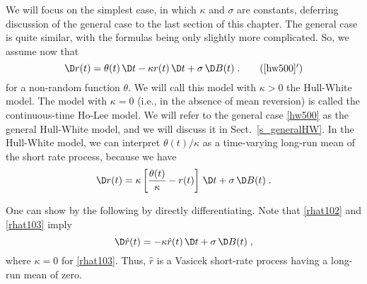 We will focus on the simplest case, in which $\kappa$ and $\sigma$ are constants, deferring discussion of the general case to the last section of this chapter.  The general case is quite similar, with the formulas being only slightly more complicated.
So, we assume now that
\begin{equation}\label{hw5000}
\D r(t) = \theta(t)\,\D t - \kappa r(t)\,\D t + \sigma \,\D B(t)\;. \tag{\ref{hw500}$'$}
\end{equation}
for a non-random function $\theta$.  
We will call this model with $\kappa>0$ the Hull-White model.  The model with 
 $\kappa=0$ (i.e., in the absence of mean reversion) is called the continuous-time Ho-Lee model.  We will refer to the general case \eqref{hw500} as the general Hull-White model, and we will discuss it in Sect.~\ref{s_generalHW}.
  In the Hull-White model, we can interpret $\theta(t)/\kappa$ as a time-varying long-run mean of the short rate process, because we have
$$\D r(t) = \kappa\left[ \frac{\theta(t)}{\kappa} - r(t)\right]\,\D t + \sigma\,\D B(t)\; .$$

\vfil\eject
One can show by the following by directly differentiating.
Note that \eqref{rhat102} and \eqref{rhat103} imply
\begin{equation}\label{rhat10001}
\D\hat{r}(t) = -\kappa \hat{r}(t)\,\D t + \sigma\,\D B(t)\; ,
\end{equation}
where $\kappa=0$ for \eqref{rhat103}.  Thus, $\hat{r}$ is a Vasicek short-rate process having a long-run mean of zero.

